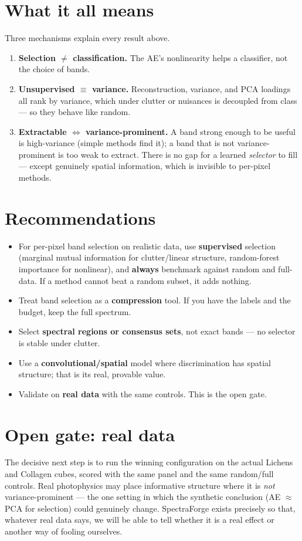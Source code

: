 \documentclass[11pt]{article}
\begin{document}
\section{What it all means}
Three mechanisms explain every result above.
\begin{enumerate}[leftmargin=1.6em,itemsep=0.1em]
\item \textbf{Selection $\ne$ classification.} The AE's nonlinearity helps a classifier, not the
choice of bands.
\item \textbf{Unsupervised $\equiv$ variance.} Reconstruction, variance, and PCA loadings all rank by
variance, which under clutter or nuisances is decoupled from class --- so they behave like random.
\item \textbf{Extractable $\Leftrightarrow$ variance-prominent.} A band strong enough to be useful is
high-variance (simple methods find it); a band that is not variance-prominent is too weak to extract.
There is no gap for a learned \emph{selector} to fill --- except genuinely spatial information, which
is invisible to per-pixel methods.
\end{enumerate}

\section{Recommendations}
\begin{itemize}[leftmargin=1.4em,itemsep=0.1em]
\item For per-pixel band selection on realistic data, use \textbf{supervised} selection (marginal
mutual information for clutter/linear structure, random-forest importance for nonlinear), and
\textbf{always} benchmark against random and full-data. If a method cannot beat a random subset, it
adds nothing.
\item Treat band selection as a \textbf{compression} tool. If you have the labels and the budget, keep
the full spectrum.
\item Select \textbf{spectral regions or consensus sets}, not exact bands --- no selector is stable
under clutter.
\item Use a \textbf{convolutional/spatial} model where discrimination has spatial structure; that is
its real, provable value.
\item Validate on \textbf{real data} with the same controls. This is the open gate.
\end{itemize}

\section{Open gate: real data}
The decisive next step is to run the winning configuration on the actual Lichens and Collagen cubes,
scored with the same panel and the same random/full controls. Real photophysics may place informative
structure where it is \emph{not} variance-prominent --- the one setting in which the synthetic
conclusion (AE $\approx$ PCA for selection) could genuinely change. SpectraForge exists precisely so
that, whatever real data says, we will be able to tell whether it is a real effect or another way of
fooling ourselves.
\end{document}

